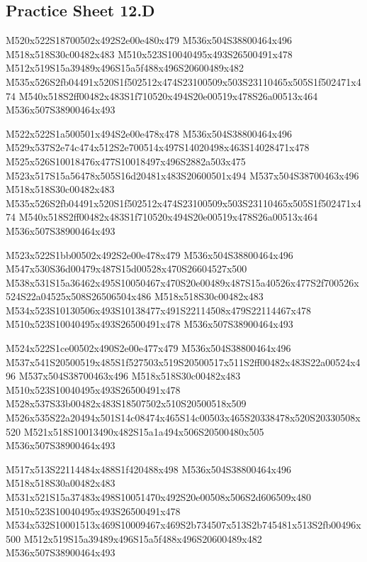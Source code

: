 \documentclass{article}
\begin{document}
\subsection{Practice Sheet 12.D}

\begin{multicols}{5}
\begin{center}

M520x522S18700502x492S2e00e480x479 %
M536x504S38800464x496 %
M518x518S30c00482x483 %
M510x523S10040495x493S26500491x478 %
M512x519S15a39489x496S15a5f488x496S20600489x482 %
M535x526S2fb04491x520S1f502512x474S23100509x503S23110465x505S1f502471x474 %
M540x518S2ff00482x483S1f710520x494S20e00519x478S26a00513x464 %
M536x507S38900464x493 %
\vfil
\columnbreak

M522x522S1a500501x494S2e00e478x478 %
M536x504S38800464x496 %
M529x537S2e74c474x512S2e700514x497S14020498x463S14028471x478 %
M525x526S10018476x477S10018497x496S2882a503x475 %
M523x517S15a56478x505S16d20481x483S20600501x494 %
M537x504S38700463x496 %
M518x518S30c00482x483 %
M535x526S2fb04491x520S1f502512x474S23100509x503S23110465x505S1f502471x474 %
M540x518S2ff00482x483S1f710520x494S20e00519x478S26a00513x464 %
M536x507S38900464x493 %
\vfil
\columnbreak

M523x522S1bb00502x492S2e00e478x479 %
M536x504S38800464x496 %
M547x530S36d00479x487S15d00528x470S26604527x500 %
M538x531S15a36462x495S10050467x470S20e00489x487S15a40526x477S2f700526x524S22a04525x508S26506504x486 %
M518x518S30c00482x483 %
M534x523S10130506x493S10138477x491S22114508x479S22114467x478 %
M510x523S10040495x493S26500491x478 %
M536x507S38900464x493 %
\vfil
\columnbreak

M524x522S1ce00502x490S2e00e477x479 %
M536x504S38800464x496 %
M537x541S20500519x485S1f527503x519S20500517x511S2ff00482x483S22a00524x496 %
M537x504S38700463x496 %
M518x518S30c00482x483 %
M510x523S10040495x493S26500491x478 %
M528x537S33b00482x483S18507502x510S20500518x509 %
M526x535S22a20494x501S14c08474x465S14c00503x465S20338478x520S20330508x520 %
M521x518S10013490x482S15a1a494x506S20500480x505 %
M536x507S38900464x493 %
\vfil
\columnbreak

M517x513S22114484x488S1f420488x498 %
M536x504S38800464x496 %
M518x518S30a00482x483 %
M531x521S15a37483x498S10051470x492S20e00508x506S2d606509x480 %
M510x523S10040495x493S26500491x478 %
M534x532S10001513x469S10009467x469S2b734507x513S2b745481x513S2fb00496x500 %
M512x519S15a39489x496S15a5f488x496S20600489x482 %
M536x507S38900464x493 %
\vfil

\end{center}
\end{multicols}
\end{document}
